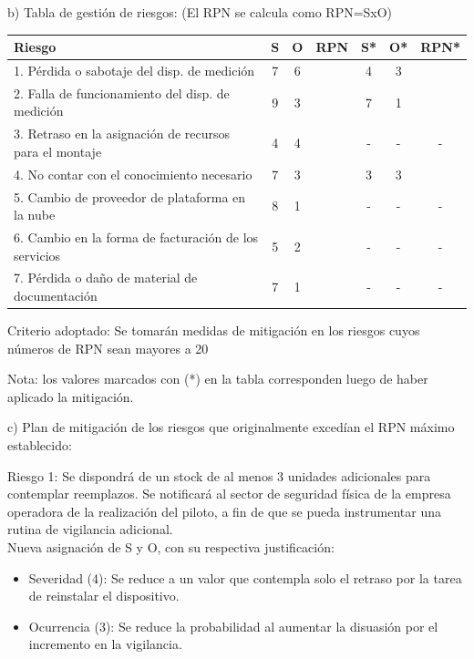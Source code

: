 \documentclass[
11pt, %
]{charter}
\begin{document}
b) Tabla de gestión de riesgos:      (El RPN se calcula como RPN=SxO)

\begin{table}[htpb]
\centering
\begin{tabularx}{\linewidth}{@{}|X|c|c|c|c|c|c|@{}}
\hline
\rowcolor[HTML]{C0C0C0} 
Riesgo & S & O & RPN & S* & O* & RPN* \\ \hline
1. Pérdida o sabotaje del disp. de medición            & 7  & 6  & \cellcolor{mirojo}{42}    & 4 & 3 & \cellcolor{miverde}{12} \\ \hline
2. Falla de funcionamiento del disp. de medición       & 9  & 3  & \cellcolor{mirojo}{27}    & 7 & 1 & \cellcolor{miverde}{7}  \\ \hline
3. Retraso en la asignación de recursos para el montaje& 4  & 4  & \cellcolor{miverde}{16}   &  -  &  - &  -    \\ \hline
4. No contar con el conocimiento necesario             & 7  & 3  & \cellcolor{mirojo}{21}    & 3 & 3 & \cellcolor{miverde}{9}   \\ \hline
5. Cambio de proveedor de plataforma en la nube        & 8  & 1  & \cellcolor{miverde}{8}   &  -  &  -  & -     \\ \hline
6. Cambio en la forma de facturación de los servicios  & 5  & 2  & \cellcolor{miverde}{10}    & -   &  -  &  -  \\ \hline
7. Pérdida o daño de material de documentación         & 7  & 1  & \cellcolor{miverde}{7}   &  -  &  -  &  -    \\ \hline
\end{tabularx}%
\end{table}

Criterio adoptado: 
Se tomarán medidas de mitigación en los riesgos cuyos números de RPN sean mayores a 20

Nota: los valores marcados con (*) en la tabla corresponden luego de haber aplicado la mitigación.

c) Plan de mitigación de los riesgos que originalmente excedían el RPN máximo establecido:
 
Riesgo 1: Se dispondrá de un stock de al menos 3 unidades adicionales para contemplar reemplazos. Se notificará al sector de seguridad física de la empresa operadora de la realización del piloto, a fin de que se pueda instrumentar una rutina de vigilancia adicional.\\
Nueva asignación de S y O, con su respectiva justificación:
\begin{itemize}
	\item Severidad (4): Se reduce a un valor que contempla solo el retraso por la tarea de reinstalar el dispositivo.
	\item Ocurrencia (3): Se reduce la probabilidad al aumentar la disuasión por el incremento en la vigilancia.
\end{itemize}
 
\end{document}
